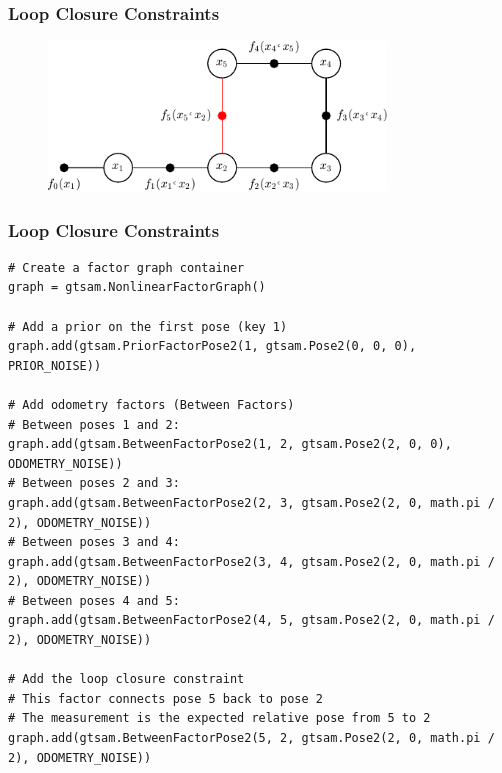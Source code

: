 \begin{frame}
    \frametitle{Loop Closure Constraints}

    \begin{figure}[!h]
        \includegraphics[width=0.8\textwidth]{./images/gtsam/factor_graph_loop_closure.pdf}
    \end{figure}

\end{frame}

\begin{frame}[fragile]
    \frametitle{Loop Closure Constraints}


    \scriptsize

\begin{lstlisting}[style=python] 
# Create a factor graph container
graph = gtsam.NonlinearFactorGraph()

# Add a prior on the first pose (key 1)
graph.add(gtsam.PriorFactorPose2(1, gtsam.Pose2(0, 0, 0), PRIOR_NOISE))

# Add odometry factors (Between Factors)
# Between poses 1 and 2:
graph.add(gtsam.BetweenFactorPose2(1, 2, gtsam.Pose2(2, 0, 0), ODOMETRY_NOISE))
# Between poses 2 and 3:
graph.add(gtsam.BetweenFactorPose2(2, 3, gtsam.Pose2(2, 0, math.pi / 2), ODOMETRY_NOISE))
# Between poses 3 and 4:
graph.add(gtsam.BetweenFactorPose2(3, 4, gtsam.Pose2(2, 0, math.pi / 2), ODOMETRY_NOISE))
# Between poses 4 and 5:
graph.add(gtsam.BetweenFactorPose2(4, 5, gtsam.Pose2(2, 0, math.pi / 2), ODOMETRY_NOISE))

# Add the loop closure constraint
# This factor connects pose 5 back to pose 2
# The measurement is the expected relative pose from 5 to 2
graph.add(gtsam.BetweenFactorPose2(5, 2, gtsam.Pose2(2, 0, math.pi / 2), ODOMETRY_NOISE))
\end{lstlisting}

\end{frame}

